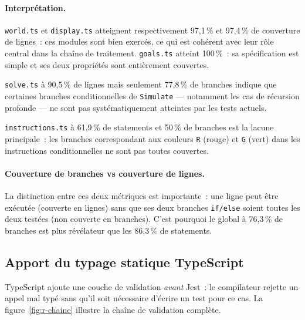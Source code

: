 \documentclass[12pt,a4paper]{article}
\begin{document}
\paragraph{Interprétation.}
\texttt{world.ts} et \texttt{display.ts} atteignent respectivement 97,1\,\%
et 97,4\,\% de couverture de lignes~: ces modules sont bien exercés, ce
qui est cohérent avec leur rôle central dans la chaîne de traitement.
\texttt{goals.ts} atteint 100\,\%~: sa spécification est simple et ses
deux propriétés sont entièrement couvertes.
 
\texttt{solve.ts} à 90,5\,\% de lignes mais seulement 77,8\,\% de
branches indique que certaines branches conditionnelles de \texttt{Simulate}
— notamment les cas de récursion profonde — ne sont pas systématiquement
atteintes par les tests actuels.
 
\texttt{instructions.ts} à 61,9\,\% de statements et 50\,\% de branches
est la lacune principale~: les branches correspondant aux couleurs
\texttt{R} (rouge) et \texttt{G} (vert) dans les instructions
conditionnelles ne sont pas toutes couvertes.
 
\paragraph{Couverture de branches vs couverture de lignes.}
La distinction entre ces deux métriques est importante~: une ligne peut
être exécutée (couverte en lignes) sans que ses deux branches
\texttt{if/else} soient toutes les deux testées (non couverte en
branches). C'est pourquoi le global à 76,3\,\% de branches est plus
révélateur que les 86,3\,\% de statements.
 
\subsection{Apport du typage statique TypeScript}
\label{subsec:r-typage}
 
TypeScript ajoute une couche de validation \emph{avant} Jest~: le
compilateur rejette un appel mal typé sans qu'il soit nécessaire
d'écrire un test pour ce cas. La figure~\ref{fig:r-chaine} illustre
la chaîne de validation complète.
 
\end{document}
